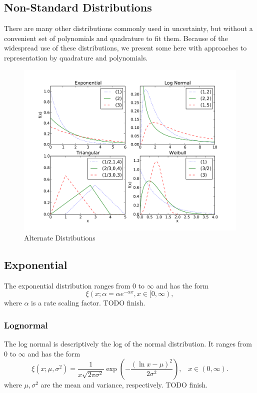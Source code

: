 \newpage

\subsection{Non-Standard Distributions}
There are many other distributions commonly used in uncertainty, but without a convenient set of polynomials and quadrature to fit them.  Because of the widespread use of these distributions, we present some here with approaches to representation by quadrature and polynomials.
\begin{figure}[h!]
\centering
\includegraphics[width=\linewidth]{./graphics/distros_alt}
\caption{Alternate Distributions}
\label{fig:distros_alt}
\end{figure}
\subsection{Exponential}
The exponential distribution ranges from 0 to $\infty$ and has the form
\begin{equation}
\xi(x;\alpha=\alpha e^{-\alpha x}, x\in [0,\infty),
\end{equation}
where $\alpha$ is a rate scaling factor. TODO finish.

\subsubsection{Lognormal}
The log normal is descriptively the log of the normal distribution.  It ranges from 0 to $\infty$ and has the form
\begin{equation}
\xi(x;\mu,\sigma^2)=\frac{1}{x\sqrt{2\pi\sigma^2}}\exp\left(-\frac{(\ln x-\mu)^2}{2\sigma^2}\right),
  \hspace{10pt} x\in(0,\infty).
\end{equation}
where $\mu,\sigma^2$ are the mean and variance, respectively.  TODO finish.

